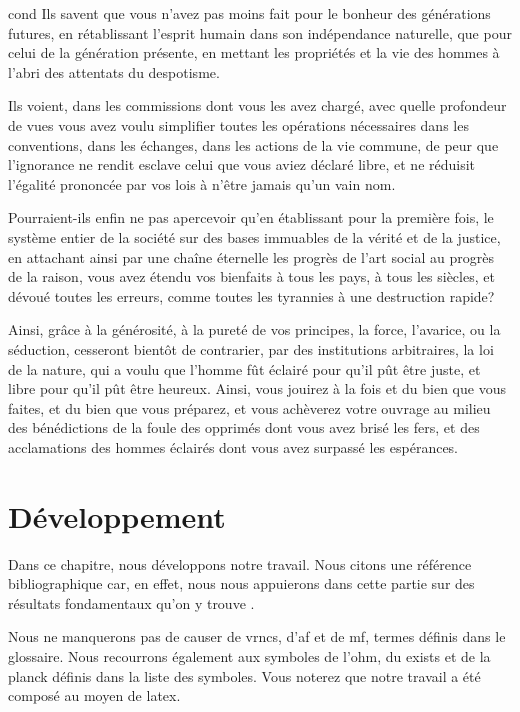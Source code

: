 \documentclass[12pt,space=onehalf,version=final]{yathesis}
\begin{document}
\begin{displaycquote}[pp.~509-511]{cond}
  Ils savent que vous n'avez pas moins fait pour le bonheur des
  générations futures, en rétablissant l'esprit humain dans son
  indépendance naturelle, que pour celui de la génération présente, en
  mettant les propriétés et la vie des hommes à l'abri des attentats
  du despotisme.

  Ils voient, dans les commissions dont vous les avez chargé, avec
  quelle profondeur de vues vous avez voulu simplifier toutes les
  opérations nécessaires dans les conventions, dans les échanges, dans
  les actions de la vie commune, de peur que l'ignorance ne rendit
  esclave celui que vous aviez déclaré libre, et ne réduisit l'égalité
  prononcée par vos lois à n'être jamais qu'un vain nom.

  Pourraient-ils enfin ne pas apercevoir qu'en établissant pour la
  première fois, le système entier de la société sur des bases
  immuables de la vérité et de la justice, en attachant ainsi par une
  chaîne éternelle les progrès de l'art social au progrès de la
  raison, vous avez étendu vos bienfaits à tous les pays, à tous les
  siècles, et dévoué toutes les erreurs, comme toutes les tyrannies à
  une destruction rapide?

  Ainsi, grâce à la générosité, à la pureté de vos principes, la
  force, l'avarice, ou la séduction, cesseront bientôt de contrarier,
  par des institutions arbitraires, la loi de la nature, qui a voulu
  que l'homme fût éclairé pour qu'il pût être juste, et libre pour
  qu'il pût être heureux. Ainsi, vous jouirez à la fois et du bien que
  vous faites, et du bien que vous préparez, et vous achèverez votre
  ouvrage au milieu des bénédictions de la foule des opprimés dont
  vous avez brisé les fers, et des acclamations des hommes éclairés
  dont vous avez surpassé les espérances.
\end{displaycquote}
\chapter{Développement}
\label{chap-developpement}

Dans ce chapitre, nous développons notre travail. Nous citons une
référence
bibliographique \autocite{relativite}
car, en effet, nous nous appuierons dans cette partie sur des
résultats fondamentaux qu'on y trouve
\autocite[chap.~3]{relativite}.

Nous ne manquerons pas de causer de \glspl{vrnc}, d'\gls{af} et de \gls{mf},
termes définis dans le glossaire. Nous recourrons également aux
symboles de l'\gls{ohm}, du \gls{exists} et de la \gls{planck} définis dans la
liste des symboles. Vous noterez que notre travail a été composé au moyen de
\gls{latex}.
\end{document}
